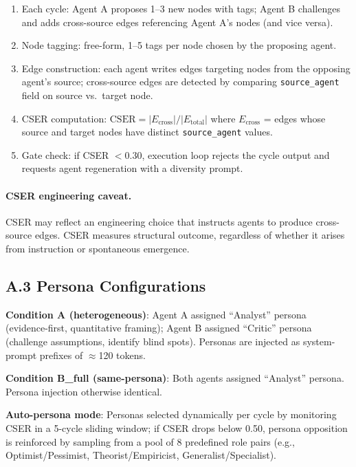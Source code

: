 \documentclass[12pt]{article}
\begin{document}
\begin{enumerate}
  \item Each cycle: Agent A proposes 1--3 new nodes with tags; Agent B challenges
        and adds cross-source edges referencing Agent A's nodes (and vice versa).
  \item Node tagging: free-form, 1--5 tags per node chosen by the proposing agent.
  \item Edge construction: each agent writes edges targeting nodes from the opposing
        agent's source; cross-source edges are detected by comparing
        \texttt{source\_agent} field on source vs.\ target node.
  \item CSER computation: $\text{CSER} = |E_\text{cross}| / |E_\text{total}|$
        where $E_\text{cross}$ = edges whose source and target nodes have distinct
        \texttt{source\_agent} values.
  \item Gate check: if CSER $< 0.30$, execution loop rejects the cycle output and
        requests agent regeneration with a diversity prompt.
\end{enumerate}

\paragraph{CSER engineering caveat.}
CSER may reflect an engineering choice that instructs agents to produce cross-source edges.
CSER measures structural outcome, regardless of whether it arises from instruction or spontaneous emergence.

\subsection*{A.3 Persona Configurations}

\textbf{Condition A (heterogeneous)}: Agent A assigned ``Analyst'' persona (evidence-first,
quantitative framing); Agent B assigned ``Critic'' persona (challenge assumptions,
identify blind spots). Personas are injected as system-prompt prefixes of
$\approx$120 tokens.

\textbf{Condition B\_full (same-persona)}: Both agents assigned ``Analyst'' persona.
Persona injection otherwise identical.

\textbf{Auto-persona mode}: Personas selected dynamically per cycle by monitoring
CSER in a 5-cycle sliding window; if CSER drops below 0.50, persona opposition
is reinforced by sampling from a pool of 8 predefined role pairs (e.g.,
Optimist/Pessimist, Theorist/Empiricist, Generalist/Specialist).
\end{document}
